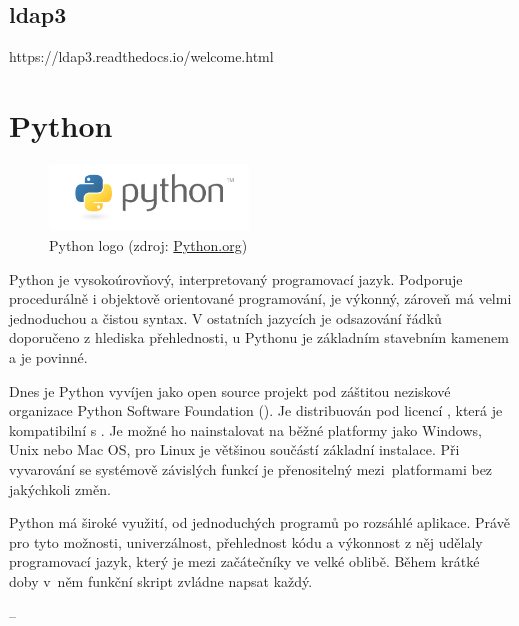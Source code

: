\subsection{ldap3}
https://ldap3.readthedocs.io/welcome.html


\newpage

\section{Python}

\begin{figure}[H] \centering
      \includegraphics[width=150pt]{./pictures/python-logo-master-v3-TM.png}
      \caption[Python logo]{Python logo (zdroj:
\href{https://www.python.org/static/community_logos/python-logo-master-v3-TM.png}{Python.org})}
      \label{fig:python}
  \end{figure}
  

Python je vysokoúrovňový, interpretovaný programovací jazyk. Podporuje
procedurálně i objektově orientované programování, je výkonný, zároveň
má velmi jednoduchou a čistou syntax. V ostatních jazycích je
odsazování řádků doporučeno z hlediska přehlednosti, u Pythonu je
základním stavebním kamenem a je povinné.\cite{Kulovana, 2017}

Dnes je Python vyvíjen jako open source projekt
pod záštitou neziskové organizace Python Software Foundation
(). Je distribuován pod licencí , která je
kompatibilní s . Je možné ho nainstalovat na běžné platformy
jako Windows, Unix nebo Mac OS, pro Linux je většinou součástí
základní instalace. Při vyvarování se systémově závislých funkcí je
přenositelný mezi~platformami bez jakýchkoli změn.

Python má široké využití, od jednoduchých programů po rozsáhlé
aplikace. Právě pro tyto možnosti, univerzálnost, přehlednost kódu a
výkonnost z něj udělaly programovací jazyk, který je mezi začátečníky ve
velké oblibě. Během krátké doby v~něm funkční skript zvládne napsat
každý.

--


